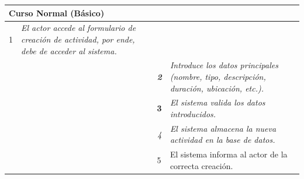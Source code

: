     \begin{table}[H]
        \begin{tabular}{llllllll}
        \hline
        \multicolumn{8}{|l|}{\cellcolor[HTML]{F2F2F2}Curso Normal (Básico)}                                                                                                                                                                                                                                                                          \\ \hline
        \multicolumn{1}{|c|}{1}  & \multicolumn{1}{p{6cm}|}{{\color[HTML]{808080} \textit{El actor accede al formulario de creación de actividad, por ende, debe de acceder al sistema.}}} & \multicolumn{1}{l|}{{\color[HTML]{808080} }}                    & \multicolumn{5}{l|}{{\color[HTML]{808080} }}                                                                                            \\ \hline
        \multicolumn{1}{|c|}{}   & \multicolumn{1}{l|}{{\color[HTML]{808080} \textit{}}}                                                 & \multicolumn{1}{c|}{{\color[HTML]{808080} \textit{\textbf{2}}}} & \multicolumn{5}{p{6cm}|}{{\color[HTML]{808080} \textit{Introduce los datos principales (nombre, tipo, descripción, duración, ubicación, etc.).}}}                         \\ \hline
        \multicolumn{1}{|l|}{}   & \multicolumn{1}{l|}{{\color[HTML]{808080} }}                                                          & \multicolumn{1}{l|}{{\color[HTML]{808080} \textbf{3}}}          & \multicolumn{5}{p{6cm}|}{{\color[HTML]{808080} \textit{El sistema valida los datos introducidos.}}} \\ \hline
        \multicolumn{1}{|l|}{}   & \multicolumn{1}{l|}{{\color[HTML]{808080} }}                                                          & \multicolumn{1}{c|}{{\color[HTML]{808080} \textit{4}}}          & \multicolumn{5}{p{6cm}|}{{\color[HTML]{808080} \textit{El sistema almacena la nueva actividad en la base de datos.}}}                   \\ \hline
        \multicolumn{1}{|l|}{}   & \multicolumn{1}{l|}{{\color[HTML]{808080} }}                                                          & \multicolumn{1}{l|}{{\color[HTML]{808080} 5}}                   & \multicolumn{5}{p{6cm}|}{{\color[HTML]{808080} El sistema informa al actor de la correcta creación.}}                                  \\ \hline
        \end{tabular}
        \end{table}

